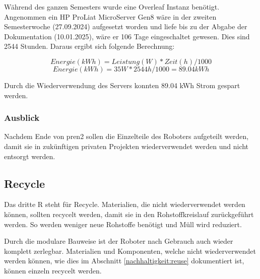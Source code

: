 Während des ganzen Semesters wurde eine Overleaf Instanz benötigt. Angenommen ein HP ProLiat MicroServer Gen8 wäre in der zweiten Semesterwoche (27.09.2024) aufgesetzt worden und liefe bis zu der Abgabe der Dokumentation (10.01.2025), wäre er 106 Tage eingeschaltet gewesen.
Dies sind 2544 Stunden. Daraus ergibt sich folgende Berechnung:

\[Energie(kWh)=Leistung(W) * Zeit(h) / 1000\]
\[Energie(kWh)=35W * 2544h / 1000 = 89.04kWh\]

 Durch die Wiederverwendung des Servers konnten 89.04 kWh Strom gespart werden.

 
\subsubsection{Ausblick}

Nachdem Ende von \acrshort{pren2} sollen die Einzelteile des Roboters aufgeteilt werden, damit sie in zukünftigen privaten Projekten wiederverwendet werden und nicht entsorgt werden.



\subsection{Recycle}

Das dritte R steht für Recycle. Materialien, die nicht wiederverwendet werden können, sollten recycelt werden, damit sie in den Rohstoffkreislauf zurückgeführt werden. So werden weniger neue Rohstoffe benötigt und Müll wird reduziert.

Durch die modulare Bauweise ist der Roboter nach Gebrauch auch wieder komplett zerlegbar. Materialien und Komponenten, welche nicht wiederverwendet werden können, wie dies im Abschnitt \ref{nachhaltigkeit:reuse} dokumentiert ist, können einzeln recycelt werden.




